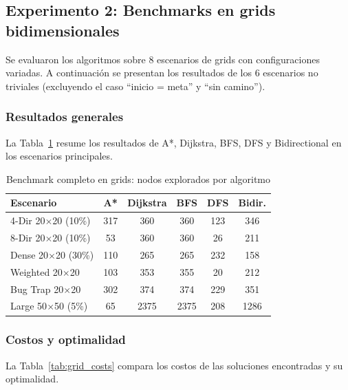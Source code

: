 \subsection{Experimento 2: Benchmarks en grids bidimensionales}

Se evaluaron los algoritmos sobre 8 escenarios de grids con configuraciones variadas. A continuación se presentan los resultados de los 6 escenarios no triviales (excluyendo el caso ``inicio = meta'' y ``sin camino'').

\subsubsection{Resultados generales}

La Tabla~\ref{tab:grid_all} resume los resultados de A*, Dijkstra, BFS, DFS y Bidirectional en los escenarios principales.

\begin{table}[H]
\centering
\caption{Benchmark completo en grids: nodos explorados por algoritmo}
\label{tab:grid_all}
\renewcommand{\arraystretch}{1.3}
\begin{tabular}{@{}lccccc@{}}
\toprule
\textbf{Escenario} & \textbf{A*} & \textbf{Dijkstra} & \textbf{BFS} & \textbf{DFS} & \textbf{Bidir.} \\
\midrule
4-Dir 20$\times$20 (10\%) & 317 & 360 & 360 & 123 & 346 \\
8-Dir 20$\times$20 (10\%) & 53 & 360 & 360 & 26 & 211 \\
Dense 20$\times$20 (30\%) & 110 & 265 & 265 & 232 & 158 \\
Weighted 20$\times$20 & 103 & 353 & 355 & 20 & 212 \\
Bug Trap 20$\times$20 & 302 & 374 & 374 & 229 & 351 \\
Large 50$\times$50 (5\%) & 65 & 2375 & 2375 & 208 & 1286 \\
\bottomrule
\end{tabular}
\end{table}

\subsubsection{Costos y optimalidad}

La Tabla~\ref{tab:grid_costs} compara los costos de las soluciones encontradas y su optimalidad.

